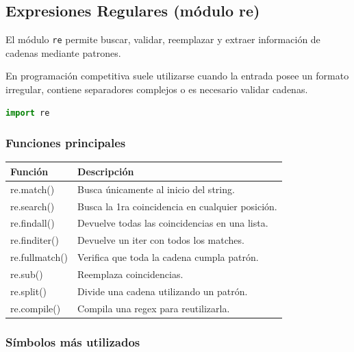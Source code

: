 \subsection{Expresiones Regulares (módulo re)}
\label{alg:2-2}

El módulo \texttt{re} permite buscar, validar, reemplazar y extraer información de cadenas mediante patrones.

En programación competitiva suele utilizarse cuando la entrada posee un formato irregular, contiene separadores complejos o es necesario validar cadenas.

\begin{lstlisting}[language=Python]
import re
\end{lstlisting}

\vspace{0.3cm}

\subsubsection{Funciones principales}

\begin{center}
\begin{tabular}{|l|p{5cm}|}
\hline
Función & Descripción \\ \hline
re.match() & Busca únicamente al inicio del string. \\ \hline
re.search() & Busca la 1ra coincidencia en cualquier posición. \\ \hline
re.findall() & Devuelve todas las coincidencias en una lista. \\ \hline
re.finditer() & Devuelve un iter con todos los matches. \\ \hline
re.fullmatch() & Verifica que toda la cadena cumpla patrón. \\ \hline
re.sub() & Reemplaza coincidencias. \\ \hline
re.split() & Divide una cadena utilizando un patrón. \\ \hline
re.compile() & Compila una regex para reutilizarla. \\ \hline
\end{tabular}
\end{center}

\vspace{0.3cm}

\subsubsection{Símbolos más utilizados}

